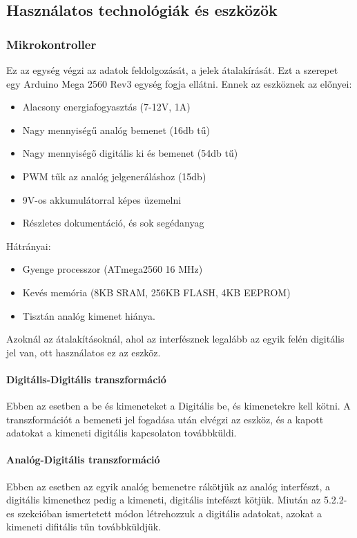 \subsection{Használatos technológiák és eszközök}

\subsubsection{Mikrokontroller}
Ez az egység végzi az adatok feldolgozását, a jelek átalakírását. Ezt a szerepet egy Arduino Mega 2560 Rev3 egység fogja ellátni\cite{parmar2017design}. Ennek az eszköznek az előnyei:
\begin{itemize}
    \item Alacsony energiafogyasztás (7-12V, 1A)\cite{arduino_docs}
    \item Nagy mennyiségű analóg bemenet (16db tű)\cite{arduino_docs}
    \item Nagy mennyiségő digitális ki és bemenet (54db tű)\cite{arduino_docs}
    \item PWM tűk az analóg jelgeneráláshoz (15db)\cite{arduino_docs}
    \item 9V-os akkumulátorral képes üzemelni \cite{arduino_docs}
    \item Részletes dokumentáció, és sok segédanyag
\end{itemize}
Hátrányai:
\begin{itemize}
    \item Gyenge processzor (ATmega2560 16 MHz)\cite{arduino_docs}
    \item Kevés memória (8KB SRAM, 256KB FLASH, 4KB EEPROM)\cite{arduino_docs}
    \item Tisztán analóg kimenet hiánya.
\end{itemize}
Azoknál az átalakításoknál, ahol az interfésznek legalább az egyik felén digitális jel van, ott használatos ez az eszköz.
\paragraph{Digitális-Digitális transzformáció}
Ebben az esetben a be és kimeneteket a Digitális be, és kimenetekre kell kötni. A transzformációt a bemeneti jel fogadása után elvégzi az eszköz, és a kapott adatokat a kimeneti digitális kapcsolaton továbbküldi.
\paragraph{Analóg-Digitális transzformáció}
Ebben az esetben az egyik analóg bemenetre rákötjük az analóg interfészt, a digitális kimenethez pedig a kimeneti, digitális intefészt kötjük. Miután az 5.2.2-es szekcióban ismertetett módon létrehozzuk a digitális adatokat, azokat a kimeneti difitális tűn továbbküldjük.
